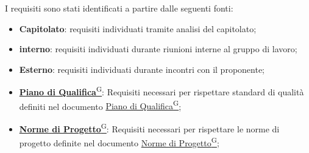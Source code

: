I requisiti sono stati identificati a partire dalle seguenti fonti:
\begin{itemize}
    \item \textbf{Capitolato}: requisiti individuati tramite analisi del capitolato;
    \item \textbf{interno}: requisiti individuati durante riunioni interne al gruppo di lavoro;
    \item \textbf{Esterno}: requisiti individuati durante incontri con il proponente;
    \item \href{https://code7crusaders.github.io/docs/PB/documentazione_interna/glossario.html#piano-di-qualifica}{\textbf{Piano di Qualifica}\textsuperscript{G}}: Requisiti necessari per rispettare standard di qualità definiti nel documento \href{https://code7crusaders.github.io/docs/PB/documentazione_interna/glossario.html#piano-di-qualifica}{Piano di Qualifica\textsuperscript{G}};
    \item \href{https://code7crusaders.github.io/docs/PB/documentazione_interna/glossario.html#norme-di-progetto}{\textbf{Norme di Progetto}\textsuperscript{G}}: Requisiti necessari per rispettare le norme di progetto definite nel documento \href{https://code7crusaders.github.io/docs/PB/documentazione_interna/glossario.html#norme-di-progetto}{Norme di Progetto\textsuperscript{G}};
\end{itemize}

